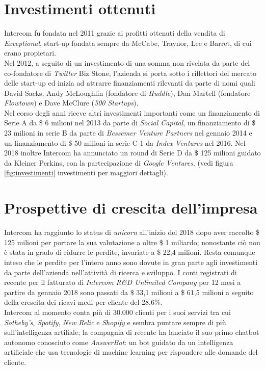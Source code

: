 \documentclass[a4paper, 11pt]{article}
\begin{document}
\section*{Investimenti ottenuti}
\par Intercom fu fondata nel 2011 grazie ai profitti ottenuti della vendita di \textit{Exceptional}, start-up fondata sempre da McCabe, Traynor, Lee e Barret, di cui erano propietari.\\
Nel 2012, a seguito di un investimento di una somma non rivelata da parte del co-fondatore di \textit{Twitter} Biz Stone\cite{bi}, l'azienda si porta sotto i riflettori del mercato delle start-up ed inizia ad attrarre finanziamenti rilevanti da parte di nomi quali David Sacks, Andy McLoughlin (fondatore di \textit{Huddle}), Dan Martell (fondatore \textit{Flowtown}) e Dave McClure (\textit{500 Startups})\cite{inv}.\\
Nel corso degli anni riceve altri investimenti importanti come un finanziamento di Serie A da \$ 6 milioni nel 2013 da parte di \textit{Social Capital}, un finanziamento di \$ 23 milioni in serie B da parte di \textit{Bessemer Venture Partners} nel gennaio 2014 e un finanziamento di \$ 50 milioni in serie C-1 da \textit{Index Ventures} nel 2016.
Nel 2018 inoltre Intercom ha annunciato un round di Serie D da \$ 125 milioni guidato da Kleiner Perkins, con la partecipazione di \textit{Google Ventures}. (vedi figura \ref{fig:investimenti} investimenti per maggiori dettagli).

\section*{Prospettive di crescita dell’impresa}
\par Intercom ha raggiunto lo status di \textit{unicorn} all'inizio del 2018 dopo aver raccolto \$ 125 milioni per portare la sua valutazione a oltre \$ 1 miliardo; nonostante ciò non è stata in grado di ridurre le perdite, invariate a \$ 22,4 milioni. Resta comunque inteso che le perdite per l'intero anno sono dovute in gran parte agli investimenti da parte dell'azienda nell'attività di ricerca e sviluppo.
I conti registrati di recente per il fatturato di \textit{Intercom R\&D Unlimited Company} per 12 mesi a partire da gennaio 2018 sono passati da \$ 33,1 milioni a \$ 61,5 milioni a seguito della crescita dei ricavi medi per cliente del 28,6\%.\\
Intercom al momento conta più di 30.000 clienti per i suoi servizi tra cui \textit{Sotheby's}, \textit{Spotify}, \textit{New Relic} e \textit{Shopify} e sembra puntare sempre di più sull'intelligenza artifiale; la compagnia di recente ha lanciato il suo primo chatbot autonomo conosciuto come \textit{AnswerBot}: un bot guidato da un intelligenza artificiale che usa tecnologie di machine learning per rispondere alle domande del cliente.\cite{irishtimes}
\newpage 
\end{document}
